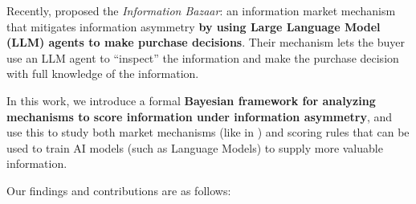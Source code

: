 Recently,  proposed the \emph{Information Bazaar}: an information market mechanism that mitigates information asymmetry \textbf{by using Large Language Model (LLM) agents to make purchase decisions}.
Their mechanism lets the buyer use an LLM agent to ``inspect'' the information and make the purchase decision with full knowledge of the information.

In this work, we introduce a formal \textbf{Bayesian framework for analyzing mechanisms to score information under information asymmetry}, and use this to study both market mechanisms (like in ) and scoring rules that can be used to train AI models (such as Language Models) to supply more valuable information.


Our findings and contributions are as follows:

